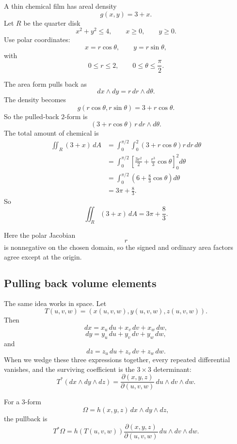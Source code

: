 \begin{example}
A thin chemical film has areal density
\[
    g(x,y)=3+x.
\]
Let \(R\) be the quarter disk
\[
    x^2+y^2\le4,
    \qquad
    x\ge0,\qquad y\ge0.
\]
Use polar coordinates:
\[
    x=r\cos\theta,
    \qquad
    y=r\sin\theta,
\]
with
\[
    0\le r\le2,
    \qquad
    0\le\theta\le\frac{\pi}{2}.
\]

The area form pulls back as
\[
    dx\wedge dy=r\,dr\wedge d\theta.
\]
The density becomes
\[
    g(r\cos\theta,r\sin\theta)=3+r\cos\theta.
\]
So the pulled-back \(2\)-form is
\[
    (3+r\cos\theta)\,r\,dr\wedge d\theta.
\]
The total amount of chemical is
\[
\begin{aligned}
    \iint_R (3+x)\,dA
    &=
    \int_0^{\pi/2}\int_0^2
    (3+r\cos\theta)r\,dr\,d\theta\\
    &=
    \int_0^{\pi/2}
    \left[
        \frac{3r^2}{2}+\frac{r^3}{3}\cos\theta
    \right]_{0}^{2}
    d\theta\\
    &=
    \int_0^{\pi/2}
    \left(
        6+\frac83\cos\theta
    \right)d\theta\\
    &=
    3\pi+\frac83.
\end{aligned}
\]
So
\[
\boxed{
    \iint_R (3+x)\,dA=3\pi+\frac83.
}
\]
\end{example}

Here the polar Jacobian
\[
    r
\]
is nonnegative on the chosen domain, so the signed and ordinary area factors agree
except at the origin.

\subsection{Pulling back volume elements}

The same idea works in space.  Let
\[
    T(u,v,w)=(x(u,v,w),y(u,v,w),z(u,v,w)).
\]
Then
\[
    dx=x_u\,du+x_v\,dv+x_w\,dw,
\]
\[
    dy=y_u\,du+y_v\,dv+y_w\,dw,
\]
and
\[
    dz=z_u\,du+z_v\,dv+z_w\,dw.
\]
When we wedge these three expressions together, every repeated differential vanishes,
and the surviving coefficient is the \(3\times3\) determinant:
\[
\boxed{
    T^*(dx\wedge dy\wedge dz)
    =
    \frac{\partial(x,y,z)}{\partial(u,v,w)}
    \,du\wedge dv\wedge dw.
}
\]

For a \(3\)-form
\[
    \Omega=h(x,y,z)\,dx\wedge dy\wedge dz,
\]
the pullback is
\[
\boxed{
    T^*\Omega
    =
    h(T(u,v,w))
    \frac{\partial(x,y,z)}{\partial(u,v,w)}
    \,du\wedge dv\wedge dw.
}
\]

